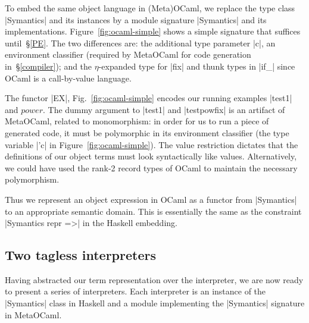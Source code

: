 To embed the same object language in (Meta)OCaml, we replace the type
class |Symantics| and its instances by a module signature |Symantics|
and its implementations.  Figure~\ref{fig:ocaml-simple} shows a simple
signature that suffices until~\S\ref{PE}.  The two differences are:
the additional type parameter |c|, an
environment classifier \cite{WalidPOPL03} (required by MetaOCaml for
code generation in~\S\ref{compiler}); and the $\eta$-expanded type for
|fix| and thunk types in |if_| since OCaml is a call-by-value
language.

The functor |EX|, Fig.~\ref{fig:ocaml-simple} encodes 
our running examples |test1| and $\mathit{power}$.
The dummy argument to |test1| and |testpowfix| is an artifact of
MetaOCaml, related to monomorphism: in order for us to run a
piece of generated code, it must be polymorphic in its environment
classifier (the type variable |'c| in Figure~\ref{fig:ocaml-simple}).
The value restriction dictates that
the definitions of our object terms must look syntactically like
values. Alternatively, we could have used
the rank-2 record types of OCaml to maintain the necessary polymorphism.

Thus we represent an object expression in
OCaml as a functor from |Symantics| to an appropriate semantic domain. This
is essentially the same as the constraint |Symantics repr =>| in the
Haskell embedding.

\subsection{Two tagless interpreters}
\label{S:interpreter-RL}

Having abstracted our term representation over the interpreter, we are
now ready to present a series of interpreters.  Each interpreter is an
instance of the |Symantics| class in Haskell and a module implementing
the |Symantics| signature in MetaOCaml.

